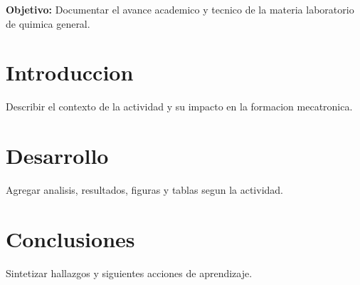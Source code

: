 \documentclass[spanish,letterpaper,oneside]{article}
\begin{document}
\templatePortrait
\templatePagecfg
\onehalfspacing

\begin{abstractd}
\textbf{Objetivo:} Documentar el avance academico y tecnico de la materia laboratorio de quimica general.
\end{abstractd}

\templateIndex
\templateFinalcfg

\section{Introduccion}
Describir el contexto de la actividad y su impacto en la formacion mecatronica.

\section{Desarrollo}
Agregar analisis, resultados, figuras y tablas segun la actividad.

\section{Conclusiones}
Sintetizar hallazgos y siguientes acciones de aprendizaje.



\end{document}
